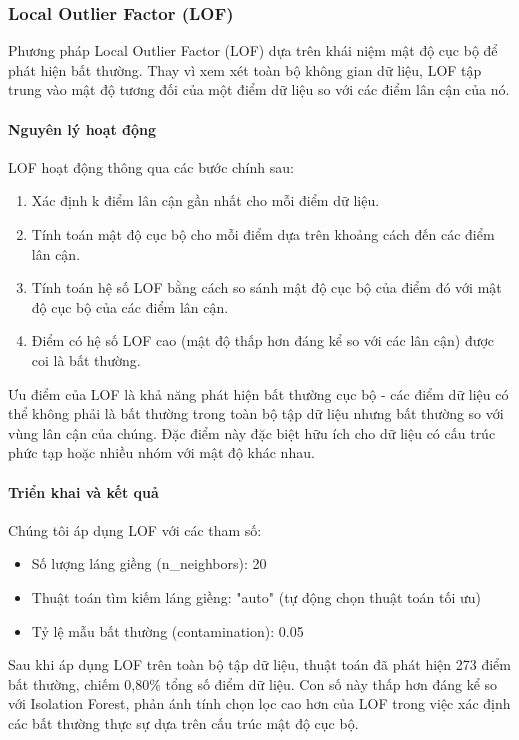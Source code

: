 \subsubsection{Local Outlier Factor (LOF)}

Phương pháp Local Outlier Factor (LOF) dựa trên khái niệm mật độ cục bộ để phát hiện bất thường. Thay vì xem xét toàn bộ không gian dữ liệu, LOF tập trung vào mật độ tương đối của một điểm dữ liệu so với các điểm lân cận của nó.

\paragraph{Nguyên lý hoạt động}
LOF hoạt động thông qua các bước chính sau:
\begin{enumerate}
    \item Xác định k điểm lân cận gần nhất cho mỗi điểm dữ liệu.
    \item Tính toán mật độ cục bộ cho mỗi điểm dựa trên khoảng cách đến các điểm lân cận.
    \item Tính toán hệ số LOF bằng cách so sánh mật độ cục bộ của điểm đó với mật độ cục bộ của các điểm lân cận.
    \item Điểm có hệ số LOF cao (mật độ thấp hơn đáng kể so với các lân cận) được coi là bất thường.
\end{enumerate}

Ưu điểm của LOF là khả năng phát hiện bất thường cục bộ - các điểm dữ liệu có thể không phải là bất thường trong toàn bộ tập dữ liệu nhưng bất thường so với vùng lân cận của chúng. Đặc điểm này đặc biệt hữu ích cho dữ liệu có cấu trúc phức tạp hoặc nhiều nhóm với mật độ khác nhau.

\paragraph{Triển khai và kết quả}
Chúng tôi áp dụng LOF với các tham số:
\begin{itemize}
    \item Số lượng láng giềng (n\_neighbors): 20
    \item Thuật toán tìm kiếm láng giềng: "auto" (tự động chọn thuật toán tối ưu)
    \item Tỷ lệ mẫu bất thường (contamination): 0.05
\end{itemize}

Sau khi áp dụng LOF trên toàn bộ tập dữ liệu, thuật toán đã phát hiện 273 điểm bất thường, chiếm 0,80\% tổng số điểm dữ liệu. Con số này thấp hơn đáng kể so với Isolation Forest, phản ánh tính chọn lọc cao hơn của LOF trong việc xác định các bất thường thực sự dựa trên cấu trúc mật độ cục bộ.

